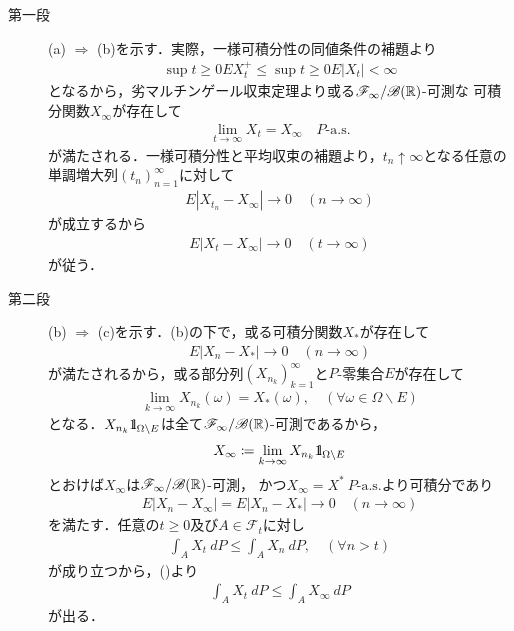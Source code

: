 	\begin{prf}\mbox{}
		\begin{description}
			\item[第一段]
				(a) $\Rightarrow$ (b)を示す．実際，一様可積分性の同値条件の補題より
				\begin{align}
					\sup{t \geq 0}{EX_t^+} \leq \sup{t \geq 0}{E|X_t|} < \infty
				\end{align}
				となるから，劣マルチンゲール収束定理より或る$\mathscr{F}_\infty/\mathscr{B}(\mathbb{R})$-可測な
				可積分関数$X_\infty$が存在して
				\begin{align}
					\lim_{t \to \infty} X_t = X_\infty
					\quad \mbox{$P$-a.s.}
				\end{align}
				が満たされる．一様可積分性と平均収束の補題より，$t_n \uparrow \infty$となる任意の単調増大列$(t_n)_{n=1}^\infty$に対して
				\begin{align}
					E|X_{t_n} - X_\infty| \longrightarrow 0
					\quad (n \longrightarrow \infty)
				\end{align}
				が成立するから
				\begin{align}
					E|X_t - X_\infty| \longrightarrow 0
					\quad (t \longrightarrow \infty)
				\end{align}
				が従う．
			
			\item[第二段]
				(b) $\Rightarrow$ (c)を示す．(b)の下で，或る可積分関数$X_*$が存在して
				\begin{align}
					E|X_n - X_*| \longrightarrow 0
					\quad (n \longrightarrow \infty)
				\end{align}
				が満たされるから，或る部分列$\left( X_{n_k} \right)_{k=1}^\infty$と$P$-零集合$E$が存在して
				\begin{align}
					\lim_{k \to \infty} X_{n_k}(\omega) = X_*(\omega),
					\quad (\forall \omega \in \Omega \backslash E)
				\end{align}
				となる．$X_{n_k}\mbox{1}\hspace{-0.25em}\mbox{l}_{\Omega \backslash E}$は全て$\mathscr{F}_\infty/\mathscr{B}(\mathbb{R})$-可測であるから，
				\begin{align}
					X_\infty \coloneqq \lim_{k \to \infty} X_{n_k} \mbox{1}\hspace{-0.25em}\mbox{l}_{\Omega \backslash E}
				\end{align}
				とおけば$X_\infty$は$\mathscr{F}_\infty/\mathscr{B}(\mathbb{R})$-可測，
				かつ$X_\infty = X^*\ \mbox{$P$-a.s.}$より可積分であり
				\begin{align}
					E|X_n - X_\infty| = E|X_n - X_*| \longrightarrow 0
					\quad (n \longrightarrow \infty)
					\label{eq:chapter_1_Problem_3_19_3}
				\end{align}
				を満たす．任意の$t \geq 0$及び$A \in \mathscr{F}_t$に対し
				\begin{align}
					\int_A X_t\ dP \leq \int_A X_n\ dP,
					\quad (\forall n > t)
					\label{eq:chapter_1_Problem_3_19_1}
				\end{align}
				が成り立つから，()より
				\begin{align}
					\int_A X_t\ dP \leq \int_A X_\infty\ dP
					\label{eq:chapter_1_Problem_3_19_2}
				\end{align}
				が出る．
				

\end{description}
\end{prf}
